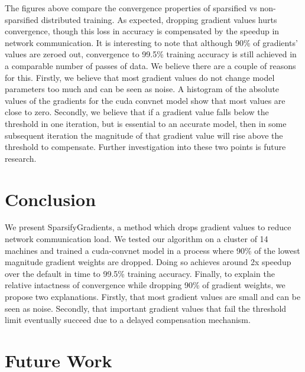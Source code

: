 \documentclass[10pt]{article}
\begin{document}
\noindent The figures above compare the convergence properties of
sparsified vs non-sparsified distributed training. As expected,
dropping gradient values hurts convergence, though this loss in
accuracy is compensated by the speedup in network communication. It
is interesting to note that although 90\% of gradients' values are
zeroed out, convergence to 99.5\% training accuracy is still achieved
in a comparable number of passes of data. We believe there are a
couple of reasons for this. Firstly, we believe that most gradient
values do not change model parameters too much and can be seen as
noise. A histogram of the absolute values of the gradients for the
cuda convnet model show that most values are close to zero. Secondly,
we believe that if a gradient value falls below the threshold in one
iteration, but is essential to an accurate model, then in some subsequent
iteration the magnitude of that gradient value will rise above the
threshold to compensate. Further investigation into these two points
is future research.

\section{Conclusion}
\label{sec-6}

We present SparsifyGradients, a method which drops gradient values to
reduce network communication load. We tested our algorithm on a
cluster of 14 machines and trained a cuda-convnet model in a process
where 90\% of the lowest magnitude gradient weights are dropped. Doing
so achieves around 2x speedup over the default in time to 99.5\%
training accuracy. Finally, to explain the relative intactness of
convergence while dropping 90\% of gradient weights, we propose two
explanations. Firstly, that most gradient values are small and can be
seen as noise. Secondly, that important gradient values that fail the
threshold limit eventually succeed due to a delayed compensation mechanism.

\section{Future Work}
\label{sec-7}
\end{document}
